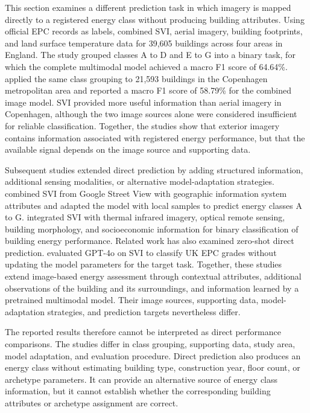 This section examines a different prediction task in which imagery is mapped directly to a registered energy class without producing building attributes. Using official \ac{EPC} records as labels, \textcite{mayer2023uk} combined \ac{SVI}, aerial imagery, building footprints, and land surface temperature data for 39,605 buildings across four areas in England. The study grouped classes A to D and E to G into a binary task, for which the complete multimodal model achieved a macro F1 score of 64.64\%. \textcite{mayer2023dk} applied the same class grouping to 21,593 buildings in the Copenhagen metropolitan area and reported a macro F1 score of 58.79\% for the combined image model. \Ac{SVI} provided more useful information than aerial imagery in Copenhagen, although the two image sources alone were considered insufficient for reliable classification. Together, the studies show that exterior imagery contains information associated with registered energy performance, but that the available signal depends on the image source and supporting data.

Subsequent studies extended direct prediction by adding structured information, additional sensing modalities, or alternative model-adaptation strategies. \textcite{liu2025} combined \ac{SVI} from Google Street View with geographic information system attributes and adapted the model with local samples to predict energy classes A to G. \textcite{sun2026} integrated \ac{SVI} with thermal infrared imagery, optical remote sensing, building morphology, and socioeconomic information for binary classification of building energy performance. Related work has also examined zero-shot direct prediction. \textcite{pan_nd} evaluated GPT-4o on \ac{SVI} to classify UK \ac{EPC} grades without updating the model parameters for the target task. Together, these studies extend image-based energy assessment through contextual attributes, additional observations of the building and its surroundings, and information learned by a pretrained multimodal model. Their image sources, supporting data, model-adaptation strategies, and prediction targets nevertheless differ.

The reported results therefore cannot be interpreted as direct performance comparisons. The studies differ in class grouping, supporting data, study area, model adaptation, and evaluation procedure. Direct prediction also produces an energy class without estimating building type, construction year, floor count, or archetype parameters. It can provide an alternative source of energy class information, but it cannot establish whether the corresponding building attributes or archetype assignment are correct.

